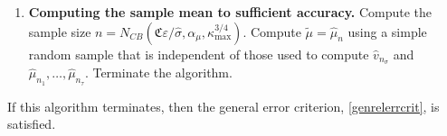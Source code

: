 \documentclass[graybox]{svmult}
\newcommand{\hv}{\hat{v}}
\newcommand{\abs}[1]{\left|#1\right|}
\newcommand{\hmu}{\hat{\mu}}
\newcommand{\hdelta}{\hat{\delta}}
\newcommand{\hvareps}{\hat{\varepsilon}}
\newcommand{\hsigma}{\hat{\sigma}}
\newcommand{\tdelta}{\tilde{\delta}}
\newcommand{\tmu}{\tilde{\mu}}
\newcommand{\fc}{\mathfrak{C}}
\def\abs#1{\ensuremath{\left \lvert #1 \right \rvert}}
\begin{document}
\begin{theorem}
\begin{enumerate}
\begin{enumerate}
\item \label{newhvarepsstep} Else, compute the next tolerance for the sample mean
\begin{gather*}
\hvareps_{0} = \begin{cases}
\displaystyle \frac{(1-\hdelta)(1-\theta)}{\hdelta \theta} -\abs{\hmu_{n_i}}, & 
\displaystyle 0 \le \abs{\hmu_{n_i}}  < \frac{(1-\hdelta)(1-\theta)}{2 \hdelta \theta},
 \\[2ex]
\displaystyle \frac{1-\hdelta}{1+\hdelta} \left[\frac{1-\theta}{\theta} +\abs{\hmu_{n_i}}\right], & 
\displaystyle \frac{(1-\hdelta)(1-\theta)}{2 \hdelta \theta} \le \abs{\hmu_{n_i}}  < \infty,
\end{cases}\\
\hvareps_{i+1} = \max(\min(\hvareps_0, \tdelta \hvareps_i), \delta \hvareps_i).
\end{gather*}


\item Define the next sample size, $n_{i+1} = N_{CB}(\hvareps_{i+1}/\hsigma,\alpha_{i+1},\kappa_{\max}^{3/4})$,
increase $i$ by one, and go to step a). 

\end{enumerate}

\item \label{hmufinalstep} {\bf Computing the sample mean to sufficient accuracy.} Compute the sample size  $n = N_{CB}(\fc \varepsilon/\hsigma,\alpha_\mu,\kappa_{\max}^{3/4})$. Compute $\tmu=\hmu_{n}$ using a simple random sample that is independent of those used to compute $\hv_{n_{\sigma}}$ and $\hmu_{n_1}, \ldots, \hmu_{n_{\tau}}$. Terminate the algorithm.

\end{enumerate}
If this algorithm terminates, then the general error criterion, \eqref{genrelerrcrit}, is satisfied.

\end{theorem}
\end{document}
